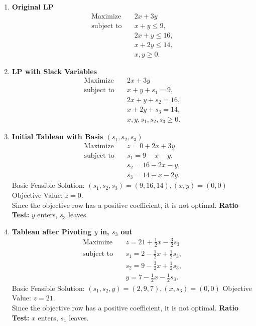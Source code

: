 \begin{enumerate}
    \item \textbf{Original LP}  
    \[
    \begin{aligned}
    \text{Maximize} \quad & 2x + 3y \\
    \text{subject to} \quad 
    & x + y \leq 9, \\
    & 2x + y \leq 16, \\
    & x + 2y \leq 14, \\
    & x, y \geq 0.
    \end{aligned}
    \]

    \item \textbf{LP with Slack Variables}  
    \[
    \begin{aligned}
    \text{Maximize} \quad & 2x + 3y \\
    \text{subject to} \quad 
    & x + y + s_1 = 9, \\
    & 2x + y + s_2 = 16, \\
    & x + 2y + s_3 = 14, \\
    & x, y, s_1, s_2, s_3 \geq 0.
    \end{aligned}
    \]

    \item \textbf{Initial Tableau with Basis \( (s_1, s_2, s_3) \)}
    \[
    \begin{aligned}
    \text{Maximize} \quad & z = 0 + 2x + 3y \\
    \text{subject to} \quad 
    & s_1 = 9 - x - y, \\
    & s_2 = 16 - 2x - y, \\
    & s_3 = 14 - x - 2y.
    \end{aligned}
    \]
    Basic Feasible Solution: \( (s_1, s_2, s_3) = (9,16,14), (x,y) = (0,0) \)  
    Objective Value: \( z = 0 \).\\  
    Since the objective row has a positive coefficient, it is not optimal.  
    \textbf{Ratio Test:} \( y \) enters, \( s_3 \) leaves.

    \item \textbf{Tableau after Pivoting \( y \) in, \( s_3 \) out}  
    \[
    \begin{aligned}
    \text{Maximize} \quad & z = 21 + \frac{1}{2}x - \frac{3}{2}s_3 \\
    \text{subject to} \quad 
    & s_1 = 2 - \frac{1}{2}x + \frac{1}{2}s_3, \\
    & s_2 = 9 - \frac{3}{2}x + \frac{1}{2}s_3, \\
    & y = 7 - \frac{1}{2}x - \frac{1}{2}s_3.
    \end{aligned}
    \]
    Basic Feasible Solution: \( (s_1, s_2, y) = (2,9,7), (x,s_3) = (0,0) \)  
    Objective Value: \( z = 21 \).\\ 
    Since the objective row has a positive coefficient, it is not optimal.  
    \textbf{Ratio Test:} \( x \) enters, \( s_1 \) leaves.


\end{enumerate}
